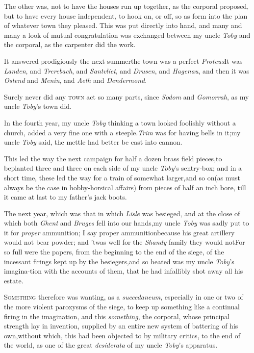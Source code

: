 \documentclass{article}
\begin{document}
The other was, not to have the houses run up together, as the
corporal proposed, but to have every house independent, to hook on,
or off, so as form into the plan of whatever town they pleased.
This was put directly into hand, and many and many a look of mutual
congratulation was exchanged between my uncle \textit{Toby} and the
corporal, as the carpenter did the work.

\newpage
\tsh It answered prodigiously the next
summer\tsh the town was a perfect
\textit{Proteus}\tsh It was \textit{Landen}, and
\textit{Trerebach}, and \textit{Santvliet}, and \textit{Drusen}, and
\textit{Hagenau},\break
\tsk and then it was \textit{Ostend} and
\textit{Menin}, and \textit{Aeth} and \textit{Dendermond}.\tsh

\tsh Surely never did any \textsc{town} act so
many parts, since \textit{Sodom} and \textit{Gomorrah}, as my uncle
\textit{Toby}’s town did.

In the fourth year, my uncle \textit{Toby} thinking a town looked
foolishly without a church, added a very fine one with a
steeple.\tsh \textit{Trim} was for having bells in
it;\tsh my uncle \textit{Toby} said, the\break
mettle had better be cast into cannon.

This led the way the next campaign for half a dozen brass
field pieces,\tsk to be\pb planted three and three on each side of my
uncle \textit{Toby}’s sentry-box; and in a short time, these
led the way for a train of somewhat larger,\tsk and so
on\tsk (as must always be the case in hobby-horsical affairs)
from pieces of half an inch bore, till it came at last to my
father’s jack boots.

The next year, which was that in which \textit{Lisle} was
besieged, and at the close of which both \textit{Ghent} and
\textit{Bruges} fell into our hands,\tsk my uncle \textit{Toby} was
sadly put to it for \textit{proper} ammunition;\break
\tsh I say proper ammunition\tsh because his great artillery
would not bear powder; and ’twas well for the \textit{Shandy}
family they would not\tsh For so full were the papers, from the
beginning to the end of the siege, of the incessant firings kept
up by the besiegers,\tsh and so heated was my uncle
\textit{Toby}’s imagina-\pb tion with the accounts of them, that he
had infallibly shot away all his estate.

\textsc{Something} therefore was wanting, as a
\textit{succedaneum}, especially in one or two of the more violent
paroxysms of the siege, to keep up something like a continual
firing in the imagination,\tsh\break
and this \textit{something}, the corporal, whose principal
strength lay in invention, supplied by an entire new system of
battering of his own,\tsk without which, this had been objected
to by military critics, to the end of the world, as one of the
great \textit{desiderata} of my uncle \textit{Toby}’s apparatus.
\end{document}

